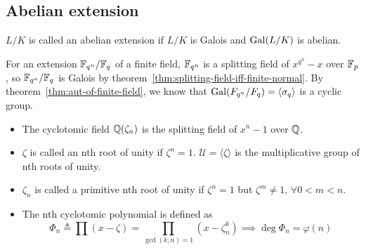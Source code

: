 \subsection{Abelian extension}

\begin{definition}
  $L/K$ is called an abelian extension if $L/K$ is Galois and $\operatorname{Gal}(L/K)$ is abelian.
\end{definition}

\begin{example}
  For an extension $\mathbb{F}_{q^n} / \mathbb{F}_q$ of a finite field, $\mathbb{F}_{q^n}$ is a splitting field of $x^{q^n}-x$
  over $\mathbb{F}_p$, so $\mathbb{F}_{q^n} / \mathbb{F}_q$ is Galois by theorem~\ref{thm:splitting-field-iff-finite-normal}.
  By theorem~\ref{thm:aut-of-finite-field}, we know that $\operatorname{Gal}(F_{q^n} / F_q) = \langle \sigma_q \rangle$
  is a cyclic group.
\end{example}

\begin{definition} \hfill
  \begin{itemize}
    \item The cyclotomic field $\mathbb{Q}(\zeta_n)$ is the splitting field of $x^n - 1$ over $\mathbb{Q}$.
    \item $\zeta$ is called an nth root of unity if $\zeta^n = 1$. $\mathcal{U} = \langle \zeta \rangle$
      is the multiplicative group of nth roots of unity.
    \item $\zeta_n$ is called a primitive nth root of unity if $\zeta^n = 1$ but $\zeta^m \ne 1, \, \forall 0 < m < n$.
    \item The nth cyclotomic polynomial is defined as
      \[ \Phi_n \triangleq \prod (x - \zeta) = \prod_{\gcd(k, n) = 1} (x - \zeta_n^k) \implies \deg \Phi_n = \varphi(n) \]
  \end{itemize}
\end{definition}

